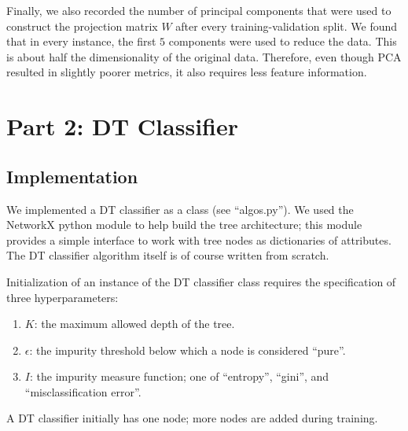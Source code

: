 \documentclass[12pt]{article}
\newcommand{\eps}{\epsilon}
\begin{document}
Finally, we also recorded the number of principal components that were used to construct the projection matrix $W$ after every training-validation split. We found that in every instance, the first $5$ components were used to reduce the data. This is about half the dimensionality of the original data. Therefore, even though PCA resulted in slightly poorer metrics, it also requires less feature information.


\section{Part 2: DT Classifier}

\subsection{Implementation}

We implemented a DT classifier as a class (see ``algos.py''). We used the NetworkX python module to help build the tree architecture; this module provides a simple interface to work with tree nodes as dictionaries of attributes. The DT classifier algorithm itself is of course written from scratch.

Initialization of an instance of the DT classifier class requires the specification of three hyperparameters:
\begin{enumerate}
\item $K$: the maximum allowed depth of the tree.
\item $\eps$: the impurity threshold below which a node is considered ``pure''.
\item $I$: the impurity measure function; one of ``entropy'', ``gini'', and ``misclassification error''.
\end{enumerate}
A DT classifier initially has one node; more nodes are added during training.
\end{document}

